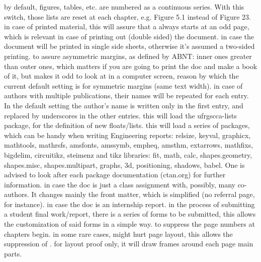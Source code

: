 \documentclass[dctools,english]{ufrgscca} %
\begin{document}
\begin{Options}
	 by default, figures, tables, etc. are numbered as a continuous series. With this switch, those lists are reset at each chapter, e.g. Figure 5.1 instead of Figure 23.
	 in case of printed material, this will assure that a \Macro{\chapter}{} always starts at an odd page, which is relevant in case of printing out (double sided) the document.
	 in case the document will be printed in single side sheets, otherwise it's assumed a two-sided printing.
	 to assure asymmetric margins, as defined by ABNT: inner ones greater than outer ones, which matters if you are going to print the doc and make a book of it, but makes it odd to look at in a computer screen, reason by which the current default setting is for symmetric margins (same text width).
	 in case of authors with multiple publications, their names will be repeated for each entry. In the default setting the author's name is written only in the first entry, and replaced by underscores in the other entries.
	 this will load the ufrgscca-lists package, for the definition of new floats/lists.
	 this will load a series of packages, which can be handy when writing Engineering reports: {\MetaFmt[Pack]\sffamily relsize, keyval, graphicx, mathtools, mathrsfs, amsfonts, amssymb, empheq, amsthm, ext\-arrows, mathfixs, bigdelim, circuitikz, steimenz} and tikz libraries: {\MetaFmt[Pack]\sffamily fit,  math, calc, shapes.geometry, shapes.misc, shapes.multipart, graphs, 3d, positioning, shadows, babel}. One is advised to look after each package documentation (ctan.org) for further information.
	 in case the doc is just a class assignment with, possibly, many co-authors. It changes mainly the front matter, which is simplified (no referral page, for instance).
	 in case the doc is an internship report.
	 in the process of submitting a student final work/report, there is a series of forms to be submitted, this allows the customization  of said forms in a simple  way.
	 to suppress the page numbers at chapters begin.
	 in some rare cases,  might hurt page layout, this allows the suppression of .
	 for layout proof only, it will draw frames around each page main parts.

\end{Options}
\end{document}
